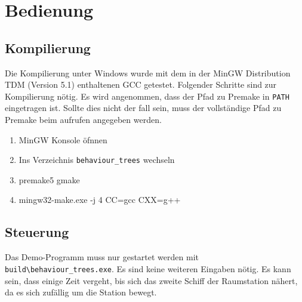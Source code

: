 \chapter{Bedienung}
\section{Kompilierung}
Die Kompilierung unter Windows wurde mit dem in der MinGW Distribution TDM (Version 5.1) enthaltenen GCC getestet. Folgender Schritte sind zur Kompilierung nötig. Es wird angenommen, dass der Pfad zu Premake in \texttt{PATH} eingetragen ist. Sollte dies nicht der fall sein, muss der vollständige Pfad zu Premake beim aufrufen angegeben werden.

\begin{enumerate}
    \item MinGW Konsole öfnnen
    \item Ins Verzeichnis \texttt{behaviour\_trees} wechseln
    \item premake5 gmake
    \item mingw32-make.exe -j 4 CC=gcc CXX=g++
\end{enumerate}

\section{Steuerung}
Das Demo-Programm muss nur gestartet werden mit \texttt{build\textbackslash{}behaviour\_trees.exe}. Es sind keine weiteren Eingaben nötig. Es kann sein, dass einige Zeit vergeht, bis sich das zweite Schiff der Raumstation nähert, da es sich zufällig um die Station bewegt.
